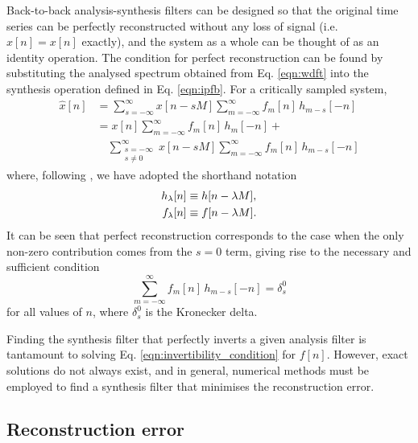 \documentclass{pasa}%
\newcommand{\Kron}{\delta_s^0}
\begin{document}
Back-to-back analysis-synthesis filters can be designed so that the original time series can be perfectly reconstructed without any loss of signal (i.e. $\hat{x}[n] = x[n]$ exactly), and the system as a whole can be thought of as an identity operation.
The condition for perfect reconstruction can be found by substituting the analysed spectrum obtained from Eq. \eqref{eqn:wdft} into the synthesis operation defined in Eq. \eqref{eqn:ipfb}.
For a critically sampled system,
\begin{equation}
    \begin{aligned}
        \hat{x}[n]
            &= \sum_{s = -\infty}^{\infty} x[n - sM]
               \sum_{m = -\infty}^{\infty} f_m[n]\, h_{m-s}[-n] \\
            &= x[n] \sum_{m = -\infty}^{\infty} f_m[n]\, h_m[-n] +{} \\
            &\quad \sum_{\substack{s = -\infty \\ s \ne 0}}^{\infty} x[n - sM]
               \sum_{m = -\infty}^{\infty} f_m[n]\, h_{m-s}[-n]
    \end{aligned}
    \label{eqn:backtoback}
\end{equation}
where, following \citet{Crochiere1983}, we have adopted the shorthand notation
\begin{equation}
    \begin{aligned}
        h_\lambda[n] &\equiv h[n - \lambda M], \\
        f_\lambda[n] &\equiv f[n - \lambda M].
    \end{aligned}
    \notag
\end{equation}
It can be seen that perfect reconstruction corresponds to the case when the only non-zero contribution comes from the $s = 0$ term, giving rise to the necessary and sufficient condition
\begin{equation}
    \sum_{m = -\infty}^{\infty} f_m[n]\,h_{m-s}[-n] = \Kron
    \label{eqn:invertibility_condition}
\end{equation}
for all values of $n$, where $\Kron$ is the Kronecker delta.

Finding the synthesis filter that perfectly inverts a given analysis filter is tantamount to solving Eq. \eqref{eqn:invertibility_condition} for $f[n]$.
However, exact solutions do not always exist, and in general, numerical methods must be employed to find a synthesis filter that minimises the reconstruction error.

\subsection{Reconstruction error}
\end{document}
